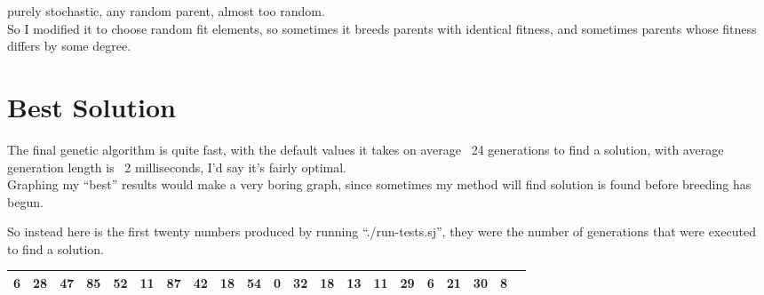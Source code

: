 \documentclass[a4paper,11pt]{article}
\begin{document}
purely stochastic, any random parent, almost too random. \\

So I modified it to choose random fit elements, so sometimes it breeds parents with identical fitness, and sometimes parents whose fitness differs by some degree.

\section*{Best Solution}
The final genetic algorithm is quite fast, with the default values it takes on average ~24 generations to find a solution, with average generation length is ~2 milliseconds, I'd say it's fairly optimal. \\

Graphing my ``best'' results would make a very boring graph, since sometimes my method will find solution is found before breeding has begun.

So instead here is the first twenty numbers produced by running ``./run-tests.sj'', they were the number of generations that were executed to find a solution.

\begin{tabular}{|l|l|l|l|l|l|l|l|l|l|l|l|l|l|l|l|l|l|l|l|l|} \hline
  6 & 28 & 47 & 85 & 52 & 11 & 87 & 42 & 18 & 54 & 0 & 32 & 18 & 13 & 11 & 29 & 6 & 21 & 30 & 8 \\ \hline
\end{tabular}

\pagebreak
\addtolength{\oddsidemargin}{-.875in}
\addtolength{\evensidemargin}{-.875in}
\addtolength{\textwidth}{3in}
\pagestyle{empty}
\end{document}

